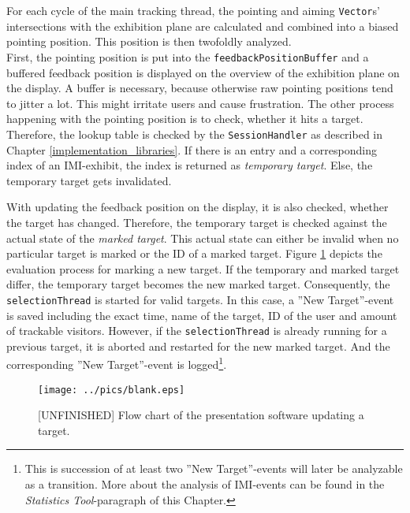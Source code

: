 For each cycle of the main tracking thread, the pointing and aiming \texttt{Vector}s' intersections with the exhibition plane are calculated and combined into a biased pointing position. This position is then twofoldly analyzed.
\\
First, the pointing position is put into the \texttt{feedbackPositionBuffer} and a buffered feedback position is displayed on the overview of the exhibition plane on the display. A buffer is necessary, because otherwise raw pointing positions tend to jitter a lot. This might irritate users and cause frustration. 
The other process happening with the pointing position is to check, whether it hits a target. Therefore, the lookup table is checked by the \texttt{SessionHandler} as described in Chapter \ref{implementation_libraries}. If there is an entry and a corresponding index of an \ac{IMI}-exhibit, the index is returned as \textit{temporary target}. Else, the temporary target gets invalidated.

With updating the feedback position on the display, it is also checked, whether the target has changed. Therefore, the temporary target is checked against the actual state of the \textit{marked target}. This actual state can either be invalid when no particular target is marked or the \ac{ID} of a marked target. Figure \ref{fig:new_target} depicts the evaluation process for marking a new target. If the temporary and marked target differ, the temporary target becomes the new marked target. Consequently, the \texttt{selectionThread} is started for valid targets. In this case, a ''New Target''-event is saved including the exact time, name of the target, ID of the user and amount of trackable visitors. However, if the \texttt{selectionThread} is already running for a previous target, it is aborted and restarted for the new marked target. And the corresponding ''New Target''-event is logged\footnote{This is succession of at least two ''New Target''-events will later be analyzable as a transition. More about the analysis of \ac{IMI}-events can be found in the \textit{Statistics Tool}-paragraph of this Chapter.}.  
\begin{figure}[H]%
\texttt{[image: ../pics/blank.eps]}%
\caption{[UNFINISHED] Flow chart of the presentation software updating a target.}
\label{fig:new_target} %
\end{figure}

